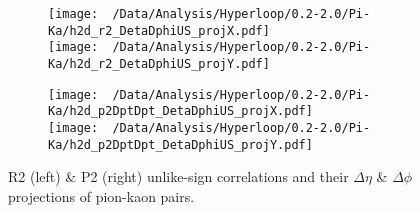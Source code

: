 \documentclass[12pt,a4paper,twoside]{report}
\begin{document}
\begin{figure}[H]
	\ContinuedFloat
	\begin{subfigure}{0.49\linewidth}
		\texttt{[image: ~/Data/Analysis/Hyperloop/0.2-2.0/Pi-Ka/h2d\_r2\_DetaDphiUS\_projX.pdf]}\\
		\texttt{[image: ~/Data/Analysis/Hyperloop/0.2-2.0/Pi-Ka/h2d\_r2\_DetaDphiUS\_projY.pdf]}\\
	\end{subfigure}
	\begin{subfigure}{0.49\linewidth}
		\texttt{[image: ~/Data/Analysis/Hyperloop/0.2-2.0/Pi-Ka/h2d\_p2DptDpt\_DetaDphiUS\_projX.pdf]}\\
		\texttt{[image: ~/Data/Analysis/Hyperloop/0.2-2.0/Pi-Ka/h2d\_p2DptDpt\_DetaDphiUS\_projY.pdf]}\\
	\end{subfigure}
	\caption{R2 (left) \& P2 (right) unlike-sign correlations and their $\Delta\eta$ \& $\Delta\phi$ projections of pion-kaon pairs.}
\end{figure}
\end{document}
